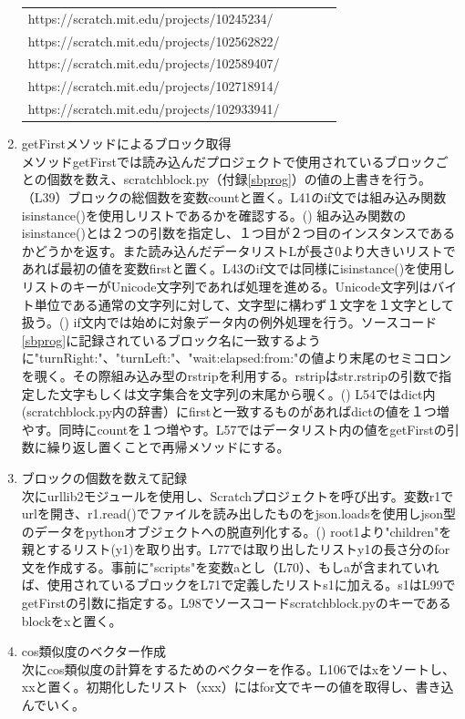 \documentclass[a4paper,10pt,onecolumn,oneside,openany]{jsbook}
\begin{document}
\begin{enumerate}
\begin{table}[h]
\begin{center}
\begin{tabular}{lclcl}
https://scratch.mit.edu/projects/10245234/ \\
https://scratch.mit.edu/projects/102562822/ \\
https://scratch.mit.edu/projects/102589407/ \\
https://scratch.mit.edu/projects/102718914/ \\
https://scratch.mit.edu/projects/102933941/ \\
\end{tabular}
\end{center}
\end{table}
\item getFirstメソッドによるブロック取得
\\メソッドgetFirstでは読み込んだプロジェクトで使用されているブロックごとの個数を数え、scratchblock.py（付録\ref{sbprog}）の値の上書きを行う。（L39）ブロックの総個数を変数countと置く。L41のif文では組み込み関数isinstance()を使用しリストであるかを確認する。(\cite{isinstance}) 組み込み関数のisinstance()とは２つの引数を指定し、１つ目が２つ目のインスタンスであるかどうかを返す。また読み込んだデータリストLが長さ0より大きいリストであれば最初の値を変数firstと置く。L43のif文では同様にisinstance()を使用しリストのキーがUnicode文字列であれば処理を進める。Unicode文字列はバイト単位である通常の文字列に対して、文字型に構わず１文字を１文字として扱う。(\cite{unicode}) if文内では始めに対象データ内の例外処理を行う。ソースコード\ref{sbprog}に記録されているブロック名に一致するように"turnRight:"、"turnLeft:"、"wait:elapsed:from:"の値より末尾のセミコロンを覗く。その際組み込み型のrstripを利用する。rstripはstr.rstripの引数で指定した文字もしくは文字集合を文字列の末尾から覗く。(\cite{rstrip}) L54ではdict内(scratchblock.py内の辞書）にfirstと一致するものがあればdictの値を１つ増やす。同時にcountを１つ増やす。L57ではデータリスト内の値をgetFirstの引数に繰り返し置くことで再帰メソッドにする。
\item ブロックの個数を数えて記録
\\次にurllib2モジュールを使用し、Scratchプロジェクトを呼び出す。変数r1でurlを開き、r1.read()でファイルを読み出したものをjson.loadsを使用しjson型のデータをpythonオブジェクトへの脱直列化する。(\cite{loads})  root1より"children"を親とするリスト(y1)を取り出す。L77では取り出したリストy1の長さ分のfor文を作成する。事前に"scripts"を変数aとし（L70）、もしaが含まれていれば、使用されているブロックをL71で定義したリストs1に加える。s1はL99でgetFirstの引数に指定する。L98でソースコードscratchblock.pyのキーであるblockをxと置く。
\item cos類似度のベクター作成
\\次にcos類似度の計算をするためのベクターを作る。L106ではxをソートし、xxと置く。初期化したリスト（xxx）にはfor文でキーの値を取得し、書き込んでいく。

\end{enumerate}
\end{document}
